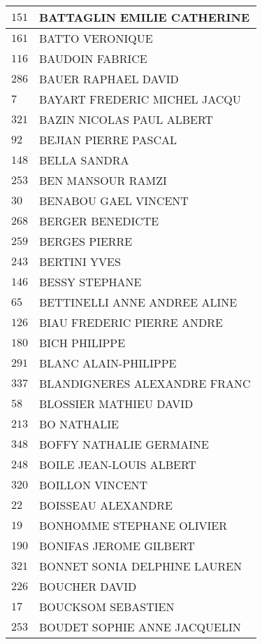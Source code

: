 \begin{xltabular}{\linewidth}{|l|X|}
    \hline
    $151$ & BATTAGLIN EMILIE CATHERINE \\
    \hline
    $161$ & BATTO VERONIQUE \\
    \hline
    $116$ & BAUDOIN FABRICE \\
    \hline
    $286$ & BAUER RAPHAEL DAVID \\
    \hline
    $7$ & BAYART FREDERIC MICHEL JACQU \\
    \hline
    $321$ & BAZIN NICOLAS PAUL ALBERT \\
    \hline
    $92$ & BEJIAN PIERRE PASCAL \\
    \hline
    $148$ & BELLA SANDRA \\
    \hline
    $253$ & BEN MANSOUR RAMZI \\
    \hline
    $30$ & BENABOU GAEL VINCENT \\
    \hline
    $268$ & BERGER BENEDICTE \\
    \hline
    $259$ & BERGES PIERRE \\
    \hline
    $243$ & BERTINI YVES \\
    \hline
    $146$ & BESSY STEPHANE \\
    \hline
    $65$ & BETTINELLI ANNE ANDREE ALINE \\
    \hline
    $126$ & BIAU FREDERIC PIERRE ANDRE \\
    \hline
    $180$ & BICH PHILIPPE \\
    \hline
    $291$ & BLANC ALAIN-PHILIPPE \\
    \hline
    $337$ & BLANDIGNERES ALEXANDRE FRANC \\
    \hline
    $58$ & BLOSSIER MATHIEU DAVID \\
    \hline
    $213$ & BO NATHALIE \\
    \hline
    $348$ & BOFFY NATHALIE GERMAINE \\
    \hline
    $248$ & BOILE JEAN-LOUIS ALBERT \\
    \hline
    $320$ & BOILLON VINCENT \\
    \hline
    $22$ & BOISSEAU ALEXANDRE \\
    \hline
    $19$ & BONHOMME STEPHANE OLIVIER \\
    \hline
    $190$ & BONIFAS JEROME GILBERT \\
    \hline
    $321$ & BONNET SONIA DELPHINE LAUREN \\
    \hline
    $226$ & BOUCHER DAVID \\
    \hline
    $17$ & BOUCKSOM SEBASTIEN \\
    \hline
    $253$ & BOUDET SOPHIE ANNE JACQUELIN \\

\end{xltabular}
